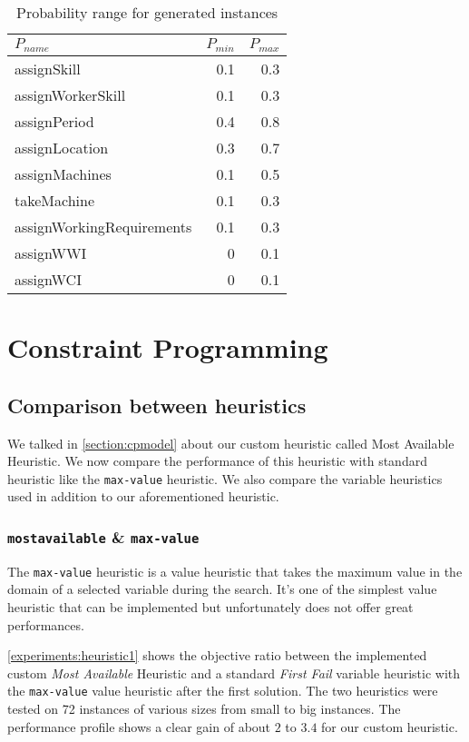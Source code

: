 \documentclass[../../thesis.tex]{subfiles}
\begin{document}
\begin{table}[H]
  \caption{Probability range for generated instances}
  \label{instances:probabilities}
  \centering
  \begin{tabular}[t]{|l r r|}
    \hline 
    $P_{name}$ & $P_{min}$ & $P_{max}$ \\
    \hline
    assignSkill & 0.1 & 0.3 \\
    assignWorkerSkill & 0.1 & 0.3 \\
    assignPeriod & 0.4 & 0.8 \\
    assignLocation & 0.3 & 0.7 \\
    assignMachines & 0.1 & 0.5 \\
    takeMachine & 0.1 & 0.3 \\
    assignWorkingRequirements & 0.1 & 0.3 \\
    assignWWI & 0 & 0.1 \\
    assignWCI & 0 & 0.1 \\
    \hline
  \end{tabular}
\end{table}

\section{Constraint Programming}

\subsection{Comparison between heuristics}

We talked in \autoref{section:cpmodel} about our custom heuristic called Most Available Heuristic.
We now compare the performance of this heuristic with standard heuristic like the \texttt{max-value} heuristic.
We also compare the variable heuristics used in addition to our aforementioned heuristic.

\subsubsection{\texttt{mostavailable} \& \texttt{max-value}}

The \texttt{max-value} heuristic is a value heuristic that takes the maximum value in the domain of a selected variable during the search.
It's one of the simplest value heuristic that can be implemented but unfortunately does not offer great performances.

\autoref{experiments:heuristic1} shows the objective ratio between the implemented custom \textit{Most Available} Heuristic and a standard 
\textit{First Fail} variable heuristic with the \texttt{max-value} value heuristic after the first solution.
The two heuristics were tested on 72 instances of various sizes from small to big instances.
The performance profile shows a clear gain of about $2$ to $3.4$ for our custom heuristic.
\end{document}
